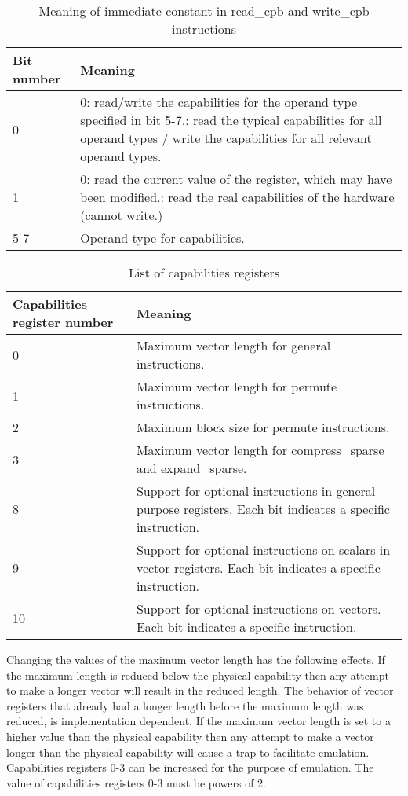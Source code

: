 \documentclass[forwardcom.tex]{subfiles}
\begin{document}
\begin{longtable} {|p{20mm}|p{90mm}|}
\caption{Meaning of immediate constant in read\_cpb and write\_cpb instructions} 
\label{table:readWriteCpbModes} \\
\endfirsthead
\endhead
\hline
\bfseries Bit number & \bfseries Meaning  \\
\hline
0  &  0: read/write the capabilities for the operand type specified in bit 5-7.\newline
      1: read the typical capabilities for all operand types / write the capabilities for all    
      relevant operand types.  \\
\hline
1  &  0: read the current value of the register, which may have been modified.\newline
      1: read the real capabilities of the hardware (cannot write.) \\
\hline
5-7 & Operand type for capabilities. \\
\hline
\end{longtable}


\begin{longtable} {|p{20mm}|p{90mm}|}
\caption{List of capabilities registers} 
\label{table:capabilitiesRegisters} \\
\endfirsthead
\endhead
\hline
\bfseries Capabilities register number & \bfseries Meaning  \\
\hline
0  &  Maximum vector length for general instructions. \\
\hline
1  &  Maximum vector length for permute instructions. \\
\hline
2  &  Maximum block size for permute instructions. \\
\hline
3  &  Maximum vector length for compress\_sparse and expand\_sparse. \\
\hline
8  &  Support for optional instructions in general purpose registers. Each bit indicates a specific instruction. \\
\hline
9  &  Support for optional instructions on scalars in vector registers. Each bit indicates a specific instruction. \\
\hline
10 &  Support for optional instructions on vectors. Each bit indicates a specific instruction. \\
\hline
\end{longtable}

Changing the values of the maximum vector length has the following effects. If the maximum length is reduced below the physical capability then any attempt to make a longer vector will result in the reduced length. The behavior of vector registers that already had a longer length before the maximum length was reduced, is implementation dependent. If the maximum vector length is set to a higher value than the physical capability then any attempt to make a vector longer than the physical capability will cause a trap to facilitate emulation. Capabilities registers 0-3 can be increased for the purpose of emulation. The value of capabilities registers 0-3 must be powers of 2.
\vspace{2mm}
\end{document}
